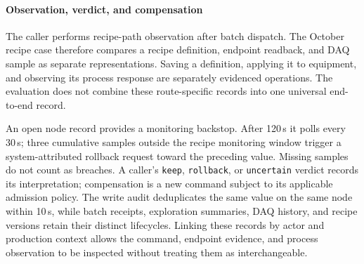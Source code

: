 \paragraph{Observation, verdict, and compensation}
The caller performs recipe-path observation after batch dispatch. The October
recipe case therefore compares a recipe definition, endpoint readback, and
DAQ sample as separate representations. Saving a definition, applying it to
equipment, and observing its process response are separately evidenced
operations. The evaluation does not combine these route-specific records into
one universal end-to-end record.

An open node record provides a monitoring backstop. After 120\,s it polls
every 30\,s; three cumulative samples outside the recipe monitoring window
trigger a system-attributed rollback request toward the preceding value.
Missing samples do not count as breaches. A caller's \texttt{keep},
\texttt{rollback}, or \texttt{uncertain} verdict records its interpretation;
compensation is a new command subject to its applicable admission policy.
The write audit deduplicates the same value on the same node within 10\,s,
while batch receipts, exploration summaries, DAQ history, and recipe versions
retain their distinct lifecycles. Linking these records by actor and
production context allows the command, endpoint evidence, and process
observation to be inspected without treating them as interchangeable.
\label{sec:agentloop}

